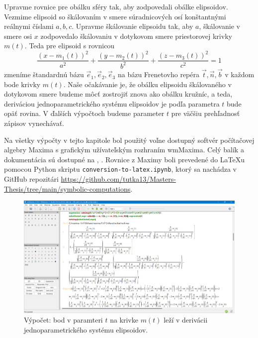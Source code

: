 Upravme rovnice pre obálku sféry tak, aby zodpovedali obálke elipsoidov. Vezmime elipsoid so škálovaním v smere súradnicových osí konštantnými reálnymi číslami $a,b,c.$ Upravme škálovanie elipsoidu tak, aby $a$, škálovanie v smere osi $x$ zodpovedalo škálovaniu v dotykovom smere priestorovej krivky $m(t).$
Teda pre elipsoid s rovnicou
\begin{equation*}
\frac{{(x - m_1(t))^2}}{{a^2}} + \frac{{(y - m_2(t))^2}}{{b^2}} + \frac{{(z - m_3(t))^2}}{{c^2}}= 1
\end{equation*} 
zmeníme štandardnú bázu $\vec{e}_1, \vec{e}_2, \vec{e}_3$ na bázu Frenetovho repéra $\vec{t}, \vec{n}, \vec{b}$ v každom bode krivky $m(t).$ Naše očakávanie je, že obálku  elipsoidu škálovaného v dotykovom smere budeme môcť zostrojiť znova ako obálku kružníc, a teda, deriváciou jednoparametrického systému elipsoidov je podľa parametra $t$ bude opäť rovina. V ďalších výpočtoch budeme parameter $t$ pre väčšiu prehľadnosť zápisov vynechávať.

Na všetky výpočty v tejto kapitole bol použitý voľne dostupný softvér počítačovej algebry Maxima s grafickým užívateľským rozhraním wmMaxima. Celý balík a dokumentácia sú dostupné na \cite{MaximaDoc}, \cite{MaximaDownload}. Rovnice z Maximy boli prevedené do \LaTeX u pomocou Python skriptu \verb|conversion-to-latex.ipynb|, ktorý sa nachádza v GitHub repozitári \url{https://github.com/tutka13/Masters-Thesis/tree/main/symbolic-computations}.

\begin{figure}[h]
	\centering
	\includegraphics[width=\textwidth]{images/maxima.png}
	\caption[Softvér Maxima.]{Výpočet: bod v paramteri $t$ na krivke $m(t)$ leží v derivácii jednoparametrického systému elipsoidov.}
	\label{fig:3D_point_lies}
\end{figure}

